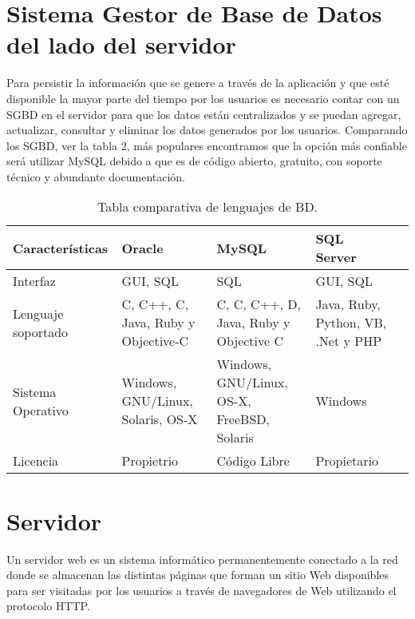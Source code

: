 	\section{Sistema Gestor de Base de Datos del lado del servidor}
	\noindent Para persistir la información que se genere a través de la aplicación y que esté disponible la mayor parte del tiempo por los usuarios es necesario contar con un SGBD en el servidor para que los datos están centralizados y se puedan agregar, actualizar, consultar y eliminar los datos generados por los usuarios. Comparando los SGBD, ver la tabla 2, más populares encontramos que la opción más confiable será utilizar MySQL debido a que es de código abierto, gratuito, con soporte técnico y abundante documentación. 
	
	\begin{table}[htbp]
		\begin{center}
			\begin{tabular}{|l|p{35mm}|p{35mm}|p{35mm}|l}
				\hline
				Caracter\'isticas & Oracle & MySQL & SQL Server \\
				\hline 
				Interfaz & GUI, SQL & SQL & GUI, SQL \\ \hline
				Lenguaje soportado & C, C++, C, Java, Ruby y Objective-C & C, C, C++, D, Java, Ruby y Objective C & Java, Ruby, Python, VB, .Net y PHP  \\ \hline
				Sistema Operativo & Windows, GNU/Linux, Solaris, OS-X & Windows, GNU/Linux, OS-X, FreeBSD, Solaris & Windows \\ \hline
				Licencia & Propietrio & Código Libre & Propietario \\ \hline
			\end{tabular}
			\caption{Tabla comparativa de lenguajes de BD.}
			\label{tabla:sencilla}
		\end{center}
	\end{table}
	\pagebreak
	

	\section{Servidor}
	\noindent Un servidor web es un sistema informático permanentemente conectado a la red donde se almacenan las distintas páginas que forman un sitio Web disponibles para ser visitadas por los usuarios a través de navegadores de Web utilizando el protocolo HTTP. 
	
